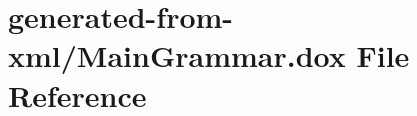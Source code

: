 \hypertarget{MainGrammar_8dox}{}\section{generated-\/from-\/xml/\+Main\+Grammar.dox File Reference}
\label{MainGrammar_8dox}
